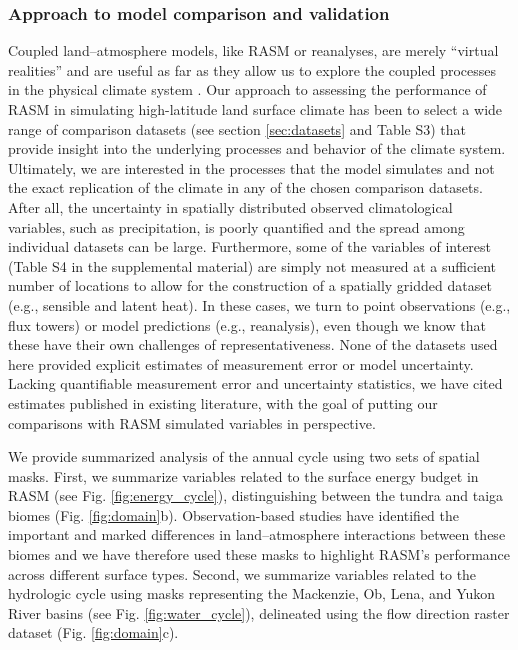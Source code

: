 \subsubsection{Approach to model comparison and validation}

Coupled land–atmosphere models, like RASM or reanalyses, are merely ``virtual realities'' and are useful as far as they allow us to explore the coupled processes in the physical climate system \citep{Betts_2004}.
Our approach to assessing the performance of RASM in simulating high-latitude land surface climate has been to select a wide range of comparison datasets (see section \ref{sec:datasets} and Table S3) that provide insight into the underlying processes and behavior of the climate system.
Ultimately, we are interested in the processes that the model simulates and not the exact replication of the climate in any of the chosen comparison datasets.
After all, the uncertainty in spatially distributed observed climatological variables, such as precipitation, is poorly quantified and the spread among individual datasets can be large.
Furthermore, some of the variables of interest (Table S4 in the supplemental material) are simply not measured at a sufficient number of locations to allow for the construction of a spatially gridded dataset (e.g., sensible and latent heat).
In these cases, we turn to point observations (e.g., flux towers) or model predictions (e.g., reanalysis), even though we know that these have their own challenges of representativeness.
None of the datasets used here provided explicit estimates of measurement error or model uncertainty.
Lacking quantifiable measurement error and uncertainty statistics, we have cited estimates published in existing literature, with the goal of putting our comparisons with RASM simulated variables in perspective.

We provide summarized analysis of the annual cycle using two sets of spatial masks.
First, we summarize variables related to the surface energy budget in RASM (see Fig. \ref{fig:energy_cycle}), distinguishing between the tundra and taiga biomes \citep{Olson_2001} (Fig. \ref{fig:domain}b).
Observation-based studies have identified the important and marked differences in land–atmosphere interactions between these biomes \citep{Beringer_2005,Chapin_2000a,Chapin_2000b} and we have therefore used these masks to highlight RASM’s performance across different surface types.
Second, we summarize variables related to the hydrologic cycle using masks representing the Mackenzie, Ob, Lena, and Yukon River basins (see Fig. \ref{fig:water_cycle}), delineated using the \citet{Wu_2011} flow direction raster dataset (Fig. \ref{fig:domain}c).

